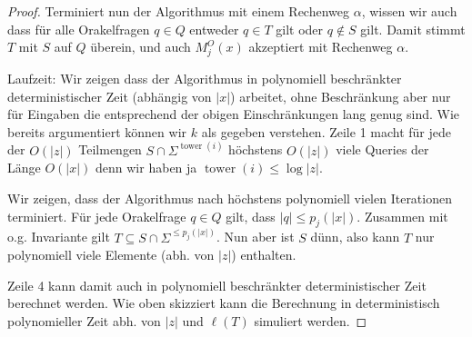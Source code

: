 \documentclass[nofonts]{uebung}
\theoremstyle{definition}
\DeclareMathOperator{\tower}{tower}
\begin{document}
\begin{proof}
    Terminiert nun der Algorithmus mit einem Rechenweg $\alpha$, wissen wir auch dass für alle Orakelfragen $q\in Q$ entweder $q\in T$ gilt oder $q\not\in S$ gilt.
    Damit stimmt $T$ mit $S$ auf $Q$ überein, und auch $M_j^O(x)$ akzeptiert mit Rechenweg $\alpha$.

    Laufzeit: Wir zeigen dass der Algorithmus in polynomiell beschränkter deterministischer Zeit (abhängig von $|x|$) arbeitet, ohne Beschränkung aber nur für Eingaben die entsprechend der obigen Einschränkungen lang genug sind. Wie bereits argumentiert können wir $k$ als gegeben verstehen.
    Zeile 1 macht für jede der $O(|z|)$ Teilmengen $S\cap\Sigma^{\tower(i)}$ höchstens $O(|z|)$ viele Queries der Länge $O(|x|)$ denn wir haben ja $\tower(i)\leq \log|z|$.

    Wir zeigen, dass der Algorithmus nach höchstens polynomiell vielen Iterationen terminiert.
    Für jede Orakelfrage $q\in Q$ gilt, dass $|q|\leq p_j(|x|)$.
    Zusammen mit o.g. Invariante gilt $T\subseteq S\cap\Sigma^{\leq p_j(|x|)}$.
    Nun aber ist $S$ dünn, also kann $T$ nur polynomiell viele Elemente (abh. von $|z|$) enthalten.

    Zeile 4 kann damit auch in polynomiell beschränkter deterministischer Zeit berechnet werden. Wie oben skizziert kann die Berechnung in deterministisch polynomieller Zeit abh. von $|z|$ und $\ell(T)$ simuliert werden.
\end{proof}
\end{document}

